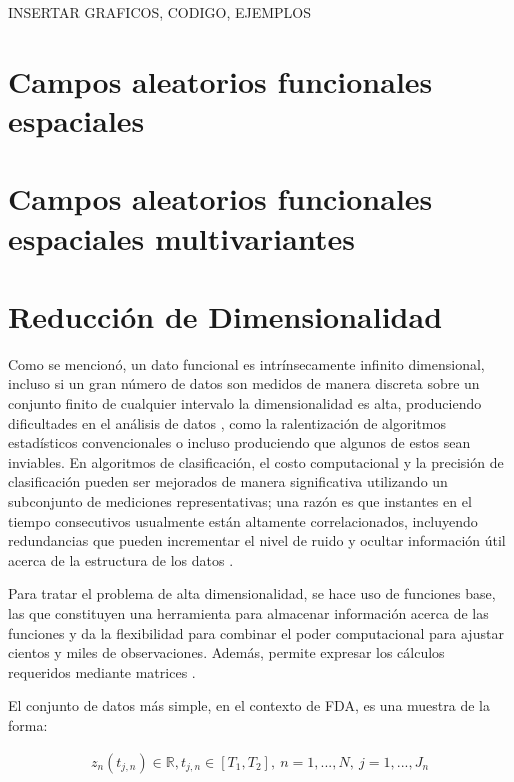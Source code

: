 \documentclass[
]{book}
\begin{document}
{INSERTAR GRAFICOS, CODIGO, EJEMPLOS}

\hypertarget{campos-aleatorios-funcionales-espaciales}{%
\section{Campos aleatorios funcionales espaciales}\label{campos-aleatorios-funcionales-espaciales}}

\hypertarget{campos-aleatorios-funcionales-espaciales-multivariantes}{%
\section{Campos aleatorios funcionales espaciales multivariantes}\label{campos-aleatorios-funcionales-espaciales-multivariantes}}

\hypertarget{reducciuxf3n-de-dimensionalidad}{%
\section{Reducción de Dimensionalidad}\label{reducciuxf3n-de-dimensionalidad}}

Como se mencionó, un dato funcional es intrínsecamente infinito dimensional, incluso si un gran número de datos son medidos de manera discreta sobre un conjunto finito de cualquier intervalo la dimensionalidad es alta, produciendo dificultades en el análisis de datos \citep{kokoska}, como la ralentización de algoritmos estadísticos convencionales o incluso produciendo que algunos de estos sean inviables. En algoritmos de clasificación, el costo computacional y la precisión de clasificación pueden ser mejorados de manera significativa utilizando un subconjunto de mediciones representativas; una razón es que instantes en el tiempo consecutivos usualmente están altamente correlacionados, incluyendo redundancias que pueden incrementar el nivel de ruido y ocultar información útil acerca de la estructura de los datos \citep{tian}.

Para tratar el problema de alta dimensionalidad, se hace uso de funciones base, las que constituyen una herramienta para almacenar información acerca de las funciones y da la flexibilidad para combinar el poder computacional para ajustar cientos y miles de observaciones. Además, permite expresar los cálculos requeridos mediante matrices \citep{ramsay}.

El conjunto de datos más simple, en el contexto de FDA, es una muestra de la forma:

\begin{align}
    z_n(t_{j,n})\in\mathbb{R}, t_{j,n}\in [T_1,T_2],\ n=1,...,N,\ j=1,...,J_n
\end{align}
\end{document}

